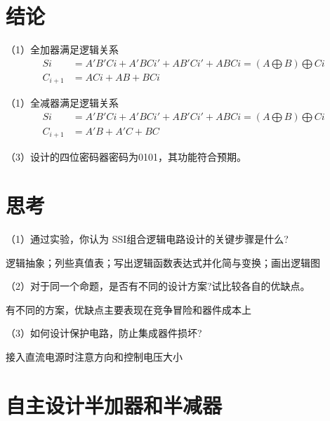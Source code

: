 \documentclass{article}
\begin{document}
\section{结论}
（1）全加器满足逻辑关系
\begin{align*}
  \ Si&=A'B'Ci+A'BCi'+AB'Ci'+ABCi=(A\bigoplus B)\bigoplus Ci\\
  \ C_{i+1}&=ACi+AB+BCi
\end{align*}
\par 

（1）全减器满足逻辑关系
\begin{align*}
  \ Si&=A'B'Ci+A'BCi'+AB'Ci'+ABCi=(A\bigoplus B)\bigoplus Ci\\
  \  C_{i+1}&=A'B+A'C+BC
\end{align*}
\par 
（3）设计的四位密码器密码为0101，其功能符合预期。
\section{思考}
（1）通过实验，你认为 SSI组合逻辑电路设计的关键步骤是什么?\par 
逻辑抽象；列些真值表；写出逻辑函数表达式并化简与变换；画出逻辑图\par  
（2）对于同一个命题，是否有不同的设计方案?试比较各自的优缺点。\par 
有不同的方案，优缺点主要表现在竞争冒险和器件成本上\par 
（3）如何设计保护电路，防止集成器件损坏?\par 
接入直流电源时注意方向和控制电压大小\par 
\newpage
\section{自主设计半加器和半减器}
\end{document}
